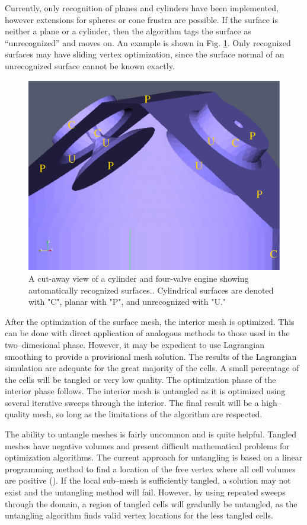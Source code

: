 \documentclass[a4paper,12pt,notitlepage]{article}
\begin{document}
Currently, only
recognition of planes and cylinders have been implemented, however
extensions for spheres or cone frustra are possible.  If the surface
is neither a plane or a cylinder, then the algorithm tags the surface
as ``unrecognized'' and moves on.  An example is shown in Fig. \ref{fig:Surfaces}.  Only recognized surfaces may have
sliding vertex optimization, since the surface normal of an
unrecognized surface cannot be known exactly.

\begin{figure}
	\centering
	\includegraphics[height=0.4\textwidth]{Images/surfaces.eps}
	\caption{A cut-away view of a cylinder and four-valve engine showing automatically recognized surfaces..  Cylindrical surfaces are denoted with "C", planar with "P", and unrecognized with "U."}
	\label{fig:Surfaces}
\end{figure}

After the optimization of the surface mesh, the interior mesh is
optimized.  This can be done with direct application of analogous
methods to those used in the two--dimesional phase.  However, it may be
expedient to use Lagrangian smoothing to provide a provisional mesh
solution.  The results of the Lagrangian simulation are adequate for
the great majority of the cells.  A small percentage of the cells will
be tangled or very low quality.  The optimization phase of the
interior phase follows.  The interior mesh is untangled as it is
optimized using several iterative sweeps through the interior.  The
final result will be a high--quality mesh, so long as the limitations
of the algorithm are respected.

The ability to untangle meshes is fairly uncommon and is quite
helpful.  Tangled meshes have negative volumes and present difficult
mathematical problems for optimization algorithms.  The current
approach for untangling is based on a linear programming method to
find a location of the free vertex where all cell volumes are positive
(\cite{optms:manual}).  If the local sub--mesh is sufficiently tangled, a
solution may not exist and the untangling method will fail.  However,
by using repeated sweeps through the domain, a region of tangled cells
will gradually be untangled, as the untangling algorithm finds valid
vertex locations for the less tangled cells.
\end{document}
